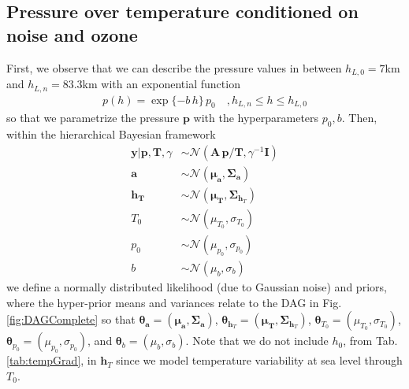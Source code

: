 \subsection{Pressure over temperature conditioned on noise and ozone}
\label{subsec:PressTempSetup}
First, we observe that we can describe the pressure values in between $h_{L,0}=7$km and $h_{L,n} = 83.3$km with an exponential function
\begin{align}
	p(h) =
	\exp{ \{ -b \, h  \} } \,  p_0 \quad ,h_{L,n}  \leq h \leq h_{L,0}
	\label{eq:pressFunc}
\end{align}
so that we parametrize the pressure $\bm{p}$ with the hyperparameters $p_0,b$.
Then, within the hierarchical Bayesian framework
\begin{subequations}
	\begin{align}
		\bm{y} |  \bm{p}, \bm{T}, \gamma &\sim \mathcal{N}(\bm{A} \, \bm{p}/\bm{T}, \gamma^{-1} \bm{I}) \label{eq:likelihoodPT} \\
		\bm{a}  &\sim \mathcal{N}(\bm{\mu}_{\bm{a}}, \bm{\Sigma}_{\bm{a}})\\
		\bm{h}_{\bm{T}}  &\sim \mathcal{N}(\bm{\mu}_{\bm{T}}, \bm{\Sigma}_{\bm{h}_T}) \\
		T_0  &\sim \mathcal{N}(\mu_{T_0}, \sigma_{T_0} )\\
		p_0  &\sim \mathcal{N}(\mu_{p_0}, \sigma_{p_0} )\\
		b  &\sim \mathcal{N}(\mu_b, \sigma_b )
	\end{align}
	\label{eq:BayMode}
\end{subequations}
we define a normally distributed likelihood (due to Gaussian noise) and priors, where the hyper-prior means and variances relate to the DAG in Fig. \ref{fig:DAGComplete} so that $\bm{\theta}_{\bm{a}} =(\bm{\mu}_{\bm{a}}, \bm{\Sigma}_{\bm{a}})$, $\bm{\theta}_{\bm{h}_T} = (\bm{\mu}_{\bm{T}}, \bm{\Sigma}_{\bm{h}_T}) $, 
$\bm{\theta}_{T_0} = (\mu_{T_0}, \sigma_{T_0})$, $\bm{\theta}_{p_0} = (\mu_{p_0}, \sigma_{p_0})$, and $\bm{\theta}_{b} = (\mu_{b}, \sigma_{b})$.
Note that we do not include $h_0$, from Tab. \ref{tab:tempGrad}, in $\bm{h}_T$ since we model temperature variability at sea level through $T_0$.

